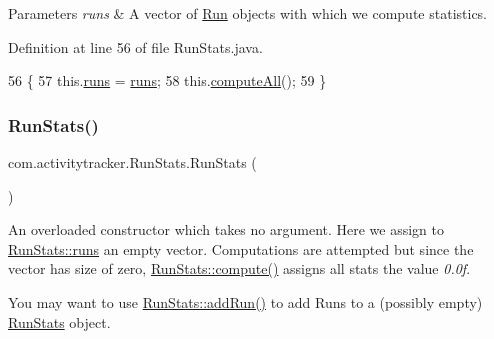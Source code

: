 \begin{DoxyParams}{Parameters}
{\em runs} & A vector of \mbox{\hyperlink{classcom_1_1activitytracker_1_1_run}{Run}} objects with which we compute statistics. \\
\hline
\end{DoxyParams}


Definition at line 56 of file Run\+Stats.\+java.


\begin{DoxyCode}
56                                      \{
57         this.\mbox{\hyperlink{classcom_1_1activitytracker_1_1_run_stats_a0fd429e9f463ddf4897c507c0e3c0a12}{runs}} = \mbox{\hyperlink{classcom_1_1activitytracker_1_1_run_stats_a0fd429e9f463ddf4897c507c0e3c0a12}{runs}};
58         this.\mbox{\hyperlink{classcom_1_1activitytracker_1_1_run_stats_a85018dbaae7a08213d443a0697e59ee4}{computeAll}}();
59     \}
\end{DoxyCode}
\mbox{\label{classcom_1_1activitytracker_1_1_run_stats_a851891349994df7dcfd7bb599c413e35}} 
\subsubsection{\texorpdfstring{Run\+Stats()}{RunStats()}\hspace{0.1cm}{\footnotesize\ttfamily [2/2]}}
{\footnotesize\ttfamily com.\+activitytracker.\+Run\+Stats.\+Run\+Stats (\begin{DoxyParamCaption}{ }\end{DoxyParamCaption})\hspace{0.3cm}{\ttfamily [package]}}

An overloaded constructor which takes no argument. Here we assign to \mbox{\hyperlink{classcom_1_1activitytracker_1_1_run_stats_a0fd429e9f463ddf4897c507c0e3c0a12}{Run\+Stats\+::runs}} an empty vector. Computations are attempted but since the vector has size of zero, \mbox{\hyperlink{classcom_1_1activitytracker_1_1_run_stats_ac73cb94cc8ff604fe446d9a327e420cc}{Run\+Stats\+::compute()}} assigns all stats the value {\itshape 0.\+0f}.

You may want to use \mbox{\hyperlink{classcom_1_1activitytracker_1_1_run_stats_a1b00f177e7c4abc155bb03c6a8b5d7dd}{Run\+Stats\+::add\+Run()}} to add Runs to a (possibly empty) \mbox{\hyperlink{classcom_1_1activitytracker_1_1_run_stats}{Run\+Stats}} object. 

